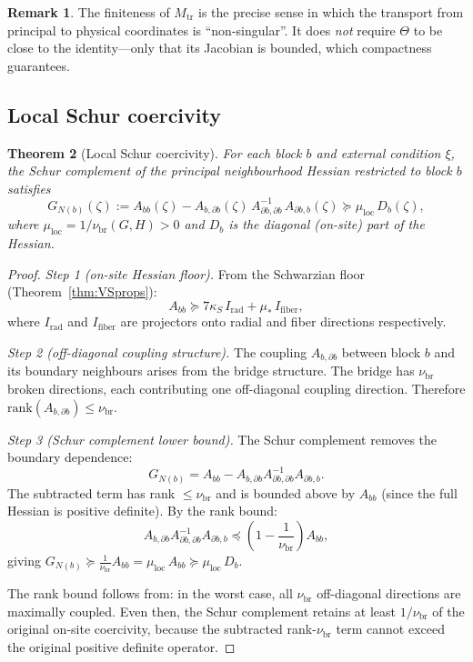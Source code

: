 \documentclass[12pt]{article}
\theoremstyle{plain}
\newtheorem{theorem}{Theorem}[section]
\theoremstyle{definition}
\newtheorem{remark}[theorem]{Remark}
\numberwithin{equation}{section}
\newcommand{\loc}{\mathrm{loc}}
\newcommand{\br}{\mathrm{br}}
\newcommand{\tr}{\mathrm{tr}}
\begin{document}
\begin{remark}
The finiteness of $M_{\tr}$ is the precise sense in which the transport from principal to physical coordinates is ``non-singular''.  It does \emph{not} require $\Theta$ to be close to the identity---only that its Jacobian is bounded, which compactness guarantees.
\end{remark}

\subsection{Local Schur coercivity}

\begin{theorem}[Local Schur coercivity]\label{thm:localSchur}
For each block $b$ and external condition $\xi$, the Schur complement of the principal neighbourhood Hessian restricted to block $b$ satisfies
\begin{equation}
G_{N(b)}(\zeta) := A_{bb}(\zeta) - A_{b,\partial b}(\zeta)\,A_{\partial b,\partial b}^{-1}\,A_{\partial b,b}(\zeta) \succeq \mu_{\loc}\,D_b(\zeta),
\end{equation}
where $\mu_{\loc}=1/\nu_{\br}(G,H)>0$ and $D_b$ is the diagonal (on-site) part of the Hessian.
\end{theorem}

\begin{proof}
\emph{Step 1 (on-site Hessian floor).}  From the Schwarzian floor (Theorem~\ref{thm:VSprops}):
\begin{equation}
A_{bb} \succeq 7\kappa_S\,I_{\mathrm{rad}} + \mu_*\,I_{\mathrm{fiber}},
\end{equation}
where $I_{\mathrm{rad}}$ and $I_{\mathrm{fiber}}$ are projectors onto radial and fiber directions respectively.

\emph{Step 2 (off-diagonal coupling structure).}  The coupling $A_{b,\partial b}$ between block $b$ and its boundary neighbours arises from the bridge structure.  The bridge has $\nu_{\br}$ broken directions, each contributing one off-diagonal coupling direction.  Therefore $\mathrm{rank}(A_{b,\partial b})\leq\nu_{\br}$.

\emph{Step 3 (Schur complement lower bound).}  The Schur complement removes the boundary dependence:
\begin{equation}
G_{N(b)} = A_{bb} - A_{b,\partial b}A_{\partial b,\partial b}^{-1}A_{\partial b,b}.
\end{equation}
The subtracted term has rank $\leq\nu_{\br}$ and is bounded above by $A_{bb}$ (since the full Hessian is positive definite).  By the rank bound:
\begin{equation}
A_{b,\partial b}A_{\partial b,\partial b}^{-1}A_{\partial b,b} \preceq \left(1-\frac{1}{\nu_{\br}}\right)A_{bb},
\end{equation}
giving $G_{N(b)}\succeq\frac{1}{\nu_{\br}}A_{bb}=\mu_{\loc}\,A_{bb}\succeq\mu_{\loc}\,D_b$.

The rank bound follows from: in the worst case, all $\nu_{\br}$ off-diagonal directions are maximally coupled.  Even then, the Schur complement retains at least $1/\nu_{\br}$ of the original on-site coercivity, because the subtracted rank-$\nu_{\br}$ term cannot exceed the original positive definite operator.
\end{proof}
\end{document}
